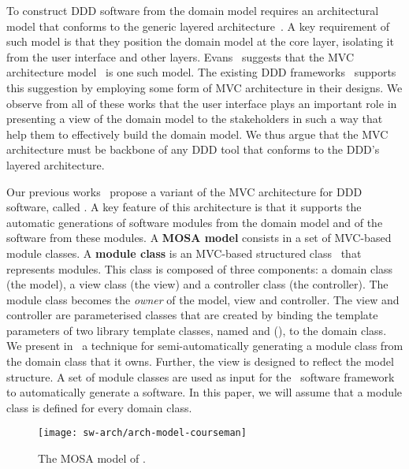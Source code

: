 To construct DDD software from the domain model requires an architectural model that conforms to the generic layered architecture~\cite{evans_domain-driven_2004, vernon_implementing_2013}. A key requirement of such model is that they position the domain model at the core layer, isolating it from the user interface and other layers. Evans~\cite{evans_domain-driven_2004} suggests that the MVC architecture model~\cite{krasner_description_1988} is one such model. The existing DDD frameworks~\cite{dan_haywood_apache_2013,paniza_learn_2011} supports this suggestion by employing some form of MVC architecture in their designs. We observe from all of these works that the user interface plays an important role in presenting a view of the domain model to the stakeholders in such a way that help them to effectively build the domain model. We thus argue that the MVC architecture must be backbone of any DDD tool that conforms to the DDD's layered architecture. 

Our previous works~\cite{le_tree-based_2015, le_generative_2018} propose a variant of the MVC architecture for DDD software, called . A key feature of this architecture is that it supports the automatic generations of software modules from the domain model and of the software from these modules.
%
A \textbf{MOSA model} consists in a set of MVC-based module classes. 
A \textbf{module class} is an MVC-based structured class~\cite{omg_unified_2015} that represents modules. This class is composed of three components: a domain class (the model), a view class (the view) and a controller class (the controller). The module class becomes the \textit{owner} of the model, view and controller. The view and controller are parameterised classes that are created by binding the template parameters of two library template classes, named  and  (\resp), to the domain class.
%
We present in~\cite{le_generative_2018} a technique for semi-automatically generating a module class from the domain class that it owns. Further, the view is designed to reflect the model structure. A set of module classes are used as input for the \jdomainapp~software framework~\cite{le_jdomainapp_2017} to automatically generate a software. In this paper, we will assume that a module class is defined for every domain class.

\begin{figure}[ht]
	\centering
	\texttt{[image: sw-arch/arch-model-courseman]}
	\caption{The MOSA model of \courseman.} %
	\label{fig:arch-model-courseman}
\end{figure}

